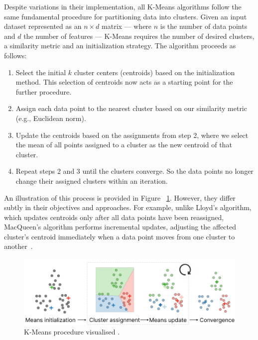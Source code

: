 \documentclass[10pt,twocolumn,letterpaper]{article}
\begin{document}
Despite variations in their implementation, all K-Means algorithms follow the
same fundamental procedure for partitioning data into clusters. Given an input
dataset represented as an $n \times d$ matrix — where $n$ is the number of data
points and $d$ the number of features — K-Means requires the number of desired
clusters, a similarity metric and an initialization strategy. The algorithm
proceeds as follows:
\begin{enumerate}
    \item Select the initial $k$ cluster centers (centroids) based on the initialization
          method. This selection of centroids now acts as a starting point for the
          further procedure.
    \item Assign each data point to the nearest cluster based on our similarity metric
          (e.g., Euclidean norm).
    \item Update the centroids based on the assignments from step 2, where we select the
          mean of all points assigned to a cluster as the new centroid of that cluster.
    \item Repeat steps 2 and 3 until the clusters converge. So the data points no longer
          change their assigned clusters within an iteration.
\end{enumerate}
An illustration of this process is provided in Figure
~\ref{fig:kmeans-procedure}. However, they differ subtly in their objectives
and approaches. For example, unlike Lloyd's algorithm, which updates centroids
only after all data points have been reassigned, MacQueen's algorithm performs
incremental updates, adjusting the affected cluster’s centroid immediately when
a data point moves from one cluster to another~\cite{TQMP9-1-15}.

\begin{figure}[t]
    \begin{center}
        \includegraphics[width=0.8\linewidth]{figures/K-Means procedure}
    \end{center}
    \caption{K-Means procedure visualised \cite{Amidi2018}.}
    \label{fig:kmeans-procedure}
\end{figure}
\end{document}
